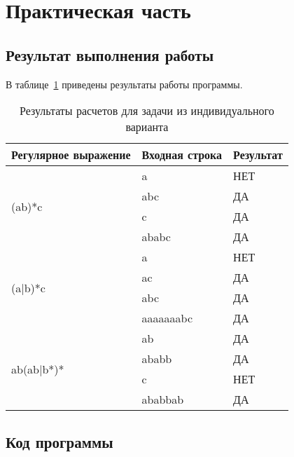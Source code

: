 \section{Практическая часть}

\subsection{Результат выполнения работы}

В таблице~\ref{tbl:result} приведены результаты работы программы.

\begin{table}[H]
    \centering
	\caption{Результаты расчетов для задачи из индивидуального варианта}
    \label{tbl:result}
\begin{tabular}{|l|l|l|}
\hline
Регулярное выражение        & Входная строка & Результат \\ \hline
\multirow{4}{*}{(ab)*c}     & a              & НЕТ       \\ \cline{2-3} 
                            & abc            & ДА        \\ \cline{2-3} 
                            & c              & ДА        \\ \cline{2-3} 
                            & ababc          & ДА        \\ \hline
\multirow{4}{*}{(a|b)*c}    & a              & НЕТ       \\ \cline{2-3} 
                            & ac             & ДА        \\ \cline{2-3} 
                            & abc            & ДА        \\ \cline{2-3} 
                            & aaaaaaabc      & ДА        \\ \hline
\multirow{4}{*}{ab(ab|b*)*} & ab             & ДА        \\ \cline{2-3} 
                            & ababb          & ДА        \\ \cline{2-3} 
                            & c              & НЕТ       \\ \cline{2-3} 
                            & ababbab        & ДА        \\ \hline
\end{tabular}
\end{table}

\subsection{Код программы}

